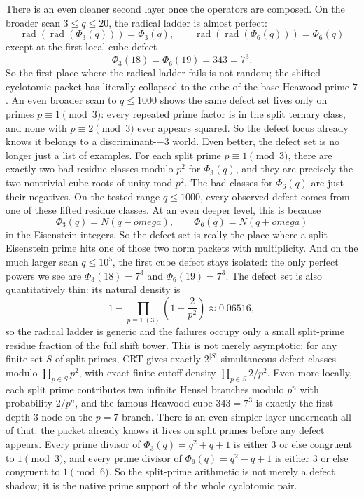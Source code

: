 \documentclass[11pt]{article}
\def\omega{omega}%
\def\Phi#1{Phi#1}%
\begin{document}
There is an even cleaner second layer once the operators are composed. On the broader scan $3 \le q \le 20$, the radical ladder is almost perfect:
\[
\operatorname{rad}(\operatorname{rad}(\Phi_3(q))) = \Phi_3(q), \qquad \operatorname{rad}(\operatorname{rad}(\Phi_6(q))) = \Phi_6(q)
\]
except at the first local cube defect
\[
\Phi_3(18) = \Phi_6(19) = 343 = 7^3.
\]
So the first place where the radical ladder fails is not random; the shifted cyclotomic packet has literally collapsed to the cube of the base Heawood prime $7$. An even broader scan to $q \le 1000$ shows the same defect set lives only on primes $p \equiv 1 \pmod 3$: every repeated prime factor is in the split ternary class, and none with $p \equiv 2 \pmod 3$ ever appears squared. So the defect locus already knows it belongs to a discriminant-$-3$ world.
Even better, the defect set is no longer just a list of examples. For each split prime $p \equiv 1 \pmod 3$, there are exactly two bad residue classes modulo $p^2$ for $\Phi_3(q)$, and they are precisely the two nontrivial cube roots of unity mod $p^2$. The bad classes for $\Phi_6(q)$ are just their negatives. On the tested range $q \le 1000$, every observed defect comes from one of these lifted residue classes.
At an even deeper level, this is because
\[
\Phi_3(q)=N(q-\omega), \qquad \Phi_6(q)=N(q+\omega)
\]
in the Eisenstein integers. So the defect set is really the place where a split Eisenstein prime hits one of those two norm packets with multiplicity.
And on the much larger scan $q \le 10^5$, the first cube defect stays isolated: the only perfect powers we see are $\Phi_3(18)=7^3$ and $\Phi_6(19)=7^3$.
The defect set is also quantitatively thin: its natural density is
\[
1-\prod_{p\equiv1\ (3)}\left(1-\frac{2}{p^2}\right)\approx0.06516,
\]
so the radical ladder is generic and the failures occupy only a small split-prime residue fraction of the full shift tower.
This is not merely asymptotic: for any finite set $S$ of split primes, CRT gives exactly $2^{|S|}$ simultaneous defect classes modulo $\prod_{p\in S}p^2$, with exact finite-cutoff density $\prod_{p\in S}2/p^2$.
Even more locally, each split prime contributes two infinite Hensel branches modulo $p^n$ with probability $2/p^n$, and the famous Heawood cube $343=7^3$ is exactly the first depth-3 node on the $p=7$ branch.
There is an even simpler layer underneath all of that: the packet already knows it lives on split primes before any defect appears. Every prime divisor of $\Phi_3(q)=q^2+q+1$ is either $3$ or else congruent to $1\pmod 3$, and every prime divisor of $\Phi_6(q)=q^2-q+1$ is either $3$ or else congruent to $1\pmod 6$. So the split-prime arithmetic is not merely a defect shadow; it is the native prime support of the whole cyclotomic pair.
\end{document}
